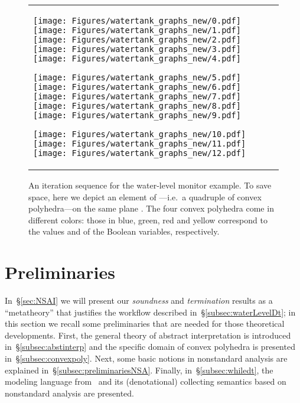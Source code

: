 \documentclass[envcountsect,orivec]{llncs} \pdfoutput=1
\theoremstyle{definition}
\begin{document}
\begin{figure}[tb]
\begin{tabular}{lll}
\begin{minipage}[t]{.32\textwidth}
\texttt{[image: Figures/watertank\_graphs\_new/0.pdf]}
\texttt{[image: Figures/watertank\_graphs\_new/1.pdf]}
\texttt{[image: Figures/watertank\_graphs\_new/2.pdf]}
\texttt{[image: Figures/watertank\_graphs\_new/3.pdf]}
\texttt{[image: Figures/watertank\_graphs\_new/4.pdf]}
\end{minipage}
\begin{minipage}[t]{.32\textwidth}
\texttt{[image: Figures/watertank\_graphs\_new/5.pdf]}
\texttt{[image: Figures/watertank\_graphs\_new/6.pdf]}
\texttt{[image: Figures/watertank\_graphs\_new/7.pdf]}
\texttt{[image: Figures/watertank\_graphs\_new/8.pdf]}
\texttt{[image: Figures/watertank\_graphs\_new/9.pdf]}
\end{minipage}
\begin{minipage}[t]{.32\textwidth}
\texttt{[image: Figures/watertank\_graphs\_new/10.pdf]}
\texttt{[image: Figures/watertank\_graphs\_new/11.pdf]}
\texttt{[image: Figures/watertank\_graphs\_new/12.pdf]}
\end{minipage}
\end{tabular}
\caption{An iteration sequence for the water-level monitor example.\newline 
To save space, here we depict 
an element of ---i.e.\ a quadruple of convex
polyhedra---on the same plane . The four convex polyhedra come in different colors:
those in blue, green, red and yellow correspond to the values
 and  of the Boolean variables,
respectively. 
} 
\label{fig:iterseq}
\end{figure}













\section{Preliminaries}\label{sec:preliminaries}
In~\S{}\ref{sec:NSAI}  we will present our \emph{soundness} and
\emph{termination} results as a ``metatheory'' that justifies the
workflow described in~\S{}\ref{subsec:waterLevelDt}; 
in this section we recall some preliminaries that are needed for those theoretical developments.
 First, the general theory of abstract interpretation is introduced in~\S{}\ref{subsec:abstinterp} and the specific domain of convex polyhedra is presented in~\S{}\ref{subsec:convexpoly}.
Next, some basic notions in nonstandard analysis are explained in~\S{}\ref{subsec:preliminariesNSA}.
Finally, in~\S{}\ref{subsec:whiledt}, the modeling language  from~\cite{Suenaga2011} and its (denotational) collecting semantics based on nonstandard analysis are presented.
\end{document}
